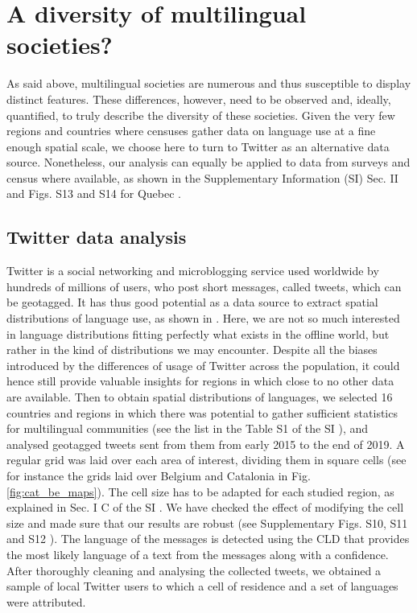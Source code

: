 \documentclass[../thesis.tex]{subfiles}
\begin{document}
\section{A diversity of multilingual societies?}
As said above, multilingual societies are numerous and thus susceptible to display
distinct features. These differences, however, need to be observed and, ideally,
quantified, to truly describe the diversity of these societies. Given the very few
regions and countries where censuses gather data on language use at a fine enough
spatial scale, we choose here to turn to Twitter as an alternative data source.
Nonetheless, our analysis can equally be applied to data from surveys and census where
available, as shown in the Supplementary Information (SI) Sec. II and Figs. S13 and S14
for Quebec \cite{supp}.


\subsection{Twitter data analysis}
Twitter is a social networking and microblogging service used worldwide by hundreds of
millions of users, who post short messages, called tweets, which can be geotagged. It
has thus good potential as a data source to extract spatial distributions of language
use, as shown in
\cite{MocanuTwitterBabel2013,PavalanathanConfoundsConsequences2015,GoncalvesCrowdsourcingDialect2014,HuangUnderstandingRegional2016,GoncalvesMappingAmericanization2018,DunnMappingLanguages2020}.
Here, we are not so much interested in language distributions fitting perfectly what
exists in the offline world, but rather in the kind of distributions we may encounter.
Despite all the biases introduced by the differences of usage of Twitter across the
population, it could hence still provide valuable insights for regions in which close to
no other data are available. Then to obtain spatial distributions of languages, we
selected 16 countries and regions in which there was potential to gather sufficient
statistics for multilingual communities (see the list in the Table S1 of the SI
\cite{supp}), and analysed geotagged tweets sent from them from early 2015 to the end
of 2019. A regular grid was laid over each area of interest, dividing them in square
cells (see for instance the grids laid over Belgium and Catalonia in Fig.
\cref{fig:cat_be_maps}). The cell size has to be adapted for each studied region, as
explained in Sec. I C of the SI \cite{supp}. We have checked the effect of modifying the
cell size and made sure that our results are robust (see Supplementary Figs. S10, S11
and S12 \cite{supp}). The language of the messages is detected using the \ac{CLD} that
provides the most likely language of a text from the messages along with a confidence.
After thoroughly cleaning and analysing the collected tweets, we obtained a sample of
local Twitter users to which a cell of residence and a set of languages were attributed.
\end{document}
